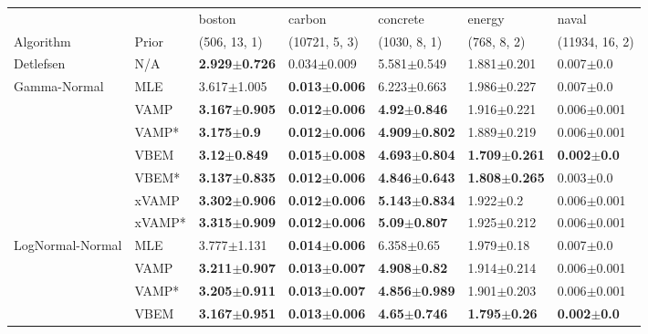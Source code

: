 \begin{tabular}{lllllll}
\toprule
        &     &                    boston &                    carbon &                  concrete &                    energy &                   naval \\
Algorithm & Prior& (506, 13, 1)& (10721, 5, 3)& (1030, 8, 1)& (768, 8, 2)& (11934, 16, 2)\\
\midrule
Detlefsen & N/A &  \textbf{2.929$\pm$0.726} &           0.034$\pm$0.009 &           5.581$\pm$0.549 &           1.881$\pm$0.201 &           0.007$\pm$0.0 \\
Gamma-Normal & MLE &           3.617$\pm$1.005 &  \textbf{0.013$\pm$0.006} &           6.223$\pm$0.663 &           1.986$\pm$0.227 &           0.007$\pm$0.0 \\
        & VAMP &  \textbf{3.167$\pm$0.905} &  \textbf{0.012$\pm$0.006} &   \textbf{4.92$\pm$0.846} &           1.916$\pm$0.221 &         0.006$\pm$0.001 \\
        & VAMP* &    \textbf{3.175$\pm$0.9} &  \textbf{0.012$\pm$0.006} &  \textbf{4.909$\pm$0.802} &           1.889$\pm$0.219 &         0.006$\pm$0.001 \\
        & VBEM &   \textbf{3.12$\pm$0.849} &  \textbf{0.015$\pm$0.008} &  \textbf{4.693$\pm$0.804} &  \textbf{1.709$\pm$0.261} &  \textbf{0.002$\pm$0.0} \\
        & VBEM* &  \textbf{3.137$\pm$0.835} &  \textbf{0.012$\pm$0.006} &  \textbf{4.846$\pm$0.643} &  \textbf{1.808$\pm$0.265} &           0.003$\pm$0.0 \\
        & xVAMP &  \textbf{3.302$\pm$0.906} &  \textbf{0.012$\pm$0.006} &  \textbf{5.143$\pm$0.834} &             1.922$\pm$0.2 &         0.006$\pm$0.001 \\
        & xVAMP* &  \textbf{3.315$\pm$0.909} &  \textbf{0.012$\pm$0.006} &   \textbf{5.09$\pm$0.807} &           1.925$\pm$0.212 &         0.006$\pm$0.001 \\
LogNormal-Normal & MLE &           3.777$\pm$1.131 &  \textbf{0.014$\pm$0.006} &            6.358$\pm$0.65 &            1.979$\pm$0.18 &           0.007$\pm$0.0 \\
        & VAMP &  \textbf{3.211$\pm$0.907} &  \textbf{0.013$\pm$0.007} &   \textbf{4.908$\pm$0.82} &           1.914$\pm$0.214 &         0.006$\pm$0.001 \\
        & VAMP* &  \textbf{3.205$\pm$0.911} &  \textbf{0.013$\pm$0.007} &  \textbf{4.856$\pm$0.989} &           1.901$\pm$0.203 &         0.006$\pm$0.001 \\
        & VBEM &  \textbf{3.167$\pm$0.951} &  \textbf{0.013$\pm$0.006} &   \textbf{4.65$\pm$0.746} &   \textbf{1.795$\pm$0.26} &  \textbf{0.002$\pm$0.0} \\

\end{tabular}
